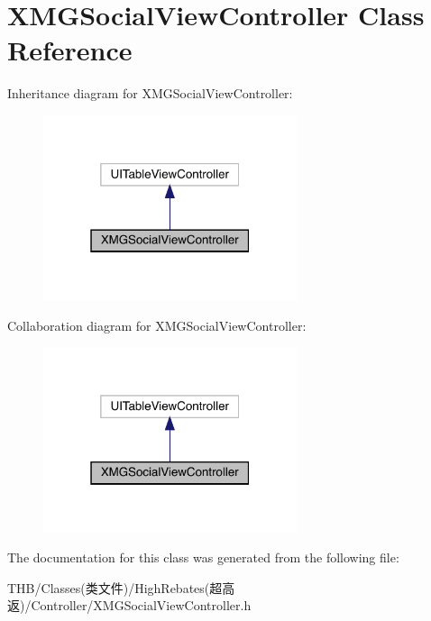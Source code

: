 \hypertarget{interface_x_m_g_social_view_controller}{}\section{X\+M\+G\+Social\+View\+Controller Class Reference}
\label{interface_x_m_g_social_view_controller}


Inheritance diagram for X\+M\+G\+Social\+View\+Controller\+:\nopagebreak
\begin{figure}[H]
\begin{center}
\leavevmode
\includegraphics[width=211pt]{interface_x_m_g_social_view_controller__inherit__graph}
\end{center}
\end{figure}


Collaboration diagram for X\+M\+G\+Social\+View\+Controller\+:\nopagebreak
\begin{figure}[H]
\begin{center}
\leavevmode
\includegraphics[width=211pt]{interface_x_m_g_social_view_controller__coll__graph}
\end{center}
\end{figure}


The documentation for this class was generated from the following file\+:\begin{DoxyCompactItemize}
\item 
T\+H\+B/\+Classes(类文件)/\+High\+Rebates(超高返)/\+Controller/X\+M\+G\+Social\+View\+Controller.\+h\end{DoxyCompactItemize}
